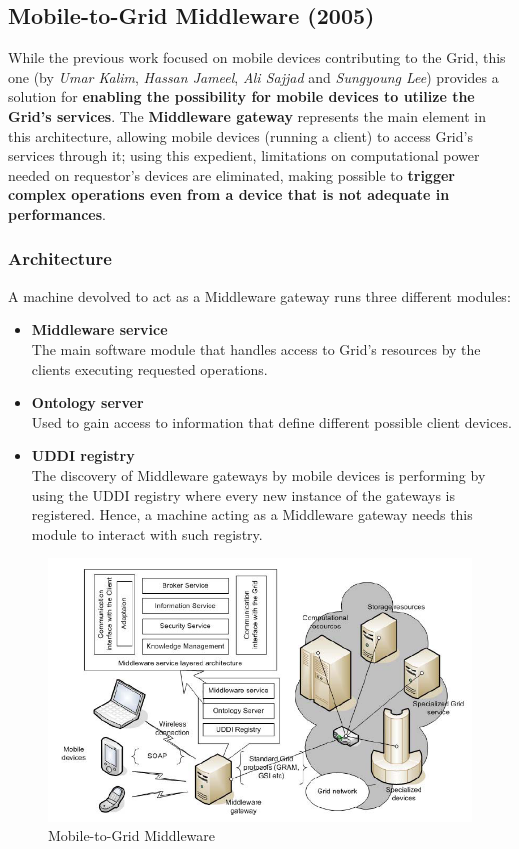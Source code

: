 \subsection{Mobile-to-Grid Middleware (2005)}
While the previous work focused on mobile devices contributing to the Grid, this one (by \textit{Umar Kalim}, \textit{Hassan Jameel}, \textit{Ali Sajjad} and \textit{Sungyoung Lee}) provides a solution for \textbf{enabling the possibility for mobile devices to utilize the Grid's services}.
The \textbf{Middleware gateway} represents the main element in this architecture, allowing mobile devices (running a client) to access Grid's services through it; using this expedient, limitations on computational power needed on requestor's devices are eliminated, making possible to \textbf{trigger complex operations even from a device that is not adequate in performances}.

\subsubsection{Architecture}
A machine devolved to act as a Middleware gateway runs three different modules:
\begin{itemize}
    \item \textbf{Middleware service}\\
    The main software module that handles access to Grid's resources by the clients executing requested operations.
    \item \textbf{Ontology server}\\
    Used to gain access to information that define different possible client devices.
    \item \textbf{UDDI registry}\\
    The discovery of Middleware gateways by mobile devices is performing by using the UDDI registry where every new instance of the gateways is registered. Hence, a machine acting as a Middleware gateway needs this module to interact with such registry.
\end{itemize}

\begin{figure}[H]
    \centering
    \includegraphics[scale=0.8]{document/chapters/chapter_3/images/2005_architecture.png}
    \caption{Mobile-to-Grid Middleware \cite{mobile_to_grid_middleware}}
    \label{fig:2005_architecture}
\end{figure}
\vspace{10mm}

